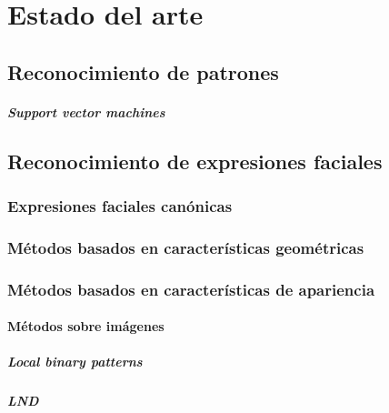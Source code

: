 \chapter[Estado del arte]{Estado del arte}
\label{ch:estado_del_arte}

\section{Reconocimiento de patrones}
\label{sec:rec_patrones}
	\paragraph{Support vector machines}
	\label{sec:svm}

\section{Reconocimiento de expresiones faciales}
\label{sec:fer}

\subsection{Expresiones faciales canónicas}
\label{sec:type_fe}



\subsection{Métodos basados en características geométricas}
\label{sec:met_geo}

\subsection{Métodos basados en características de apariencia}
\label{sec:met_apa}

	\subsubsection{Métodos sobre imágenes}
	\label{sec:met_imagen}

		\paragraph{Local binary patterns}
		\label{sec:lbp}

		\paragraph{LND}
		\label{sec:lnd}

